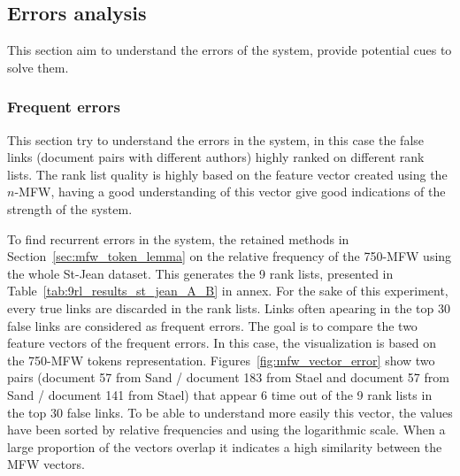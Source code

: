 \subsection{Errors analysis}

This section aim to understand the errors of the system, provide potential cues to solve them.

\subsubsection{Frequent errors}
\label{sec:frequent_errors}

This section try to understand the errors in the system, in this case the false links (document pairs with different authors) highly ranked on different rank lists.
The rank list quality is highly based on the feature vector created using the $n$-MFW, having a good understanding of this vector give good indications of the strength of the system.

To find recurrent errors in the system, the retained methods in Section~\ref{sec:mfw_token_lemma} on the relative frequency of the 750-MFW using the whole St-Jean dataset.
This generates the 9 rank lists, presented in Table~\ref{tab:9rl_results_st_jean_A_B} in annex.
For the sake of this experiment, every true links are discarded in the rank lists.
Links often apearing in the top 30 false links are considered as frequent errors.
The goal is to compare the two feature vectors of the frequent errors.
In this case, the visualization is based on the 750-MFW tokens representation.
Figures~\ref{fig:mfw_vector_error} show two pairs (document 57 from Sand / document 183 from Stael and document 57 from Sand / document 141 from Stael) that appear 6 time out of the 9 rank lists in the top 30 false links.
To be able to understand more easily this vector, the values have been sorted by relative frequencies and using the logarithmic scale.
When a large proportion of the vectors overlap it indicates a high similarity between the MFW vectors.

